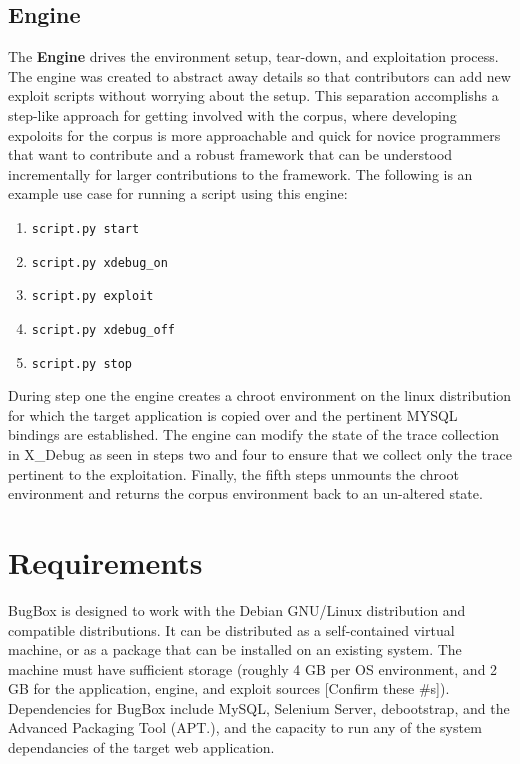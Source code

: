 \documentclass[letterpaper,twocolumn,10pt]{article}
\begin{document}
\subsection{Engine}
The {\bf Engine} drives the environment setup, tear-down, and exploitation process.  The engine was created to abstract away details so that contributors can add new exploit scripts without worrying about the setup.  This separation accomplishs a step-like approach for getting involved with the corpus, where developing expoloits for the corpus is more approachable and quick for novice programmers that want to contribute and a robust framework that can be understood incrementally for larger contributions to the framework.  The following is an  example use case for running a script using this engine:

\begin{enumerate}
	\item {\tt script.py start}
	\item {\tt script.py xdebug\_on}
	\item {\tt script.py exploit}
	\item {\tt script.py xdebug\_off}
	\item {\tt script.py stop}
\end{enumerate}

During step one the engine creates a chroot environment on the linux distribution for which the target application is copied over and the pertinent MYSQL bindings are established.  The engine can modify the state of the trace collection in X\_Debug as seen in steps two and four to ensure that we collect only the trace pertinent to the exploitation.  Finally, the fifth steps unmounts the chroot environment and returns the corpus environment back to an un-altered state.

\section{Requirements}

BugBox is designed to work with the Debian GNU/Linux distribution and compatible distributions.  It can be distributed as a self-contained virtual machine, or as a package that can be installed on an existing system. The machine must have sufficient storage (roughly 4 GB per OS environment, and 2 GB for the application, engine, and exploit sources [Confirm these \#s]).  Dependencies for BugBox include MySQL,  Selenium Server, debootstrap, and the Advanced Packaging Tool (APT.), and the capacity to run any of the system dependancies of the target web application.
\end{document}
